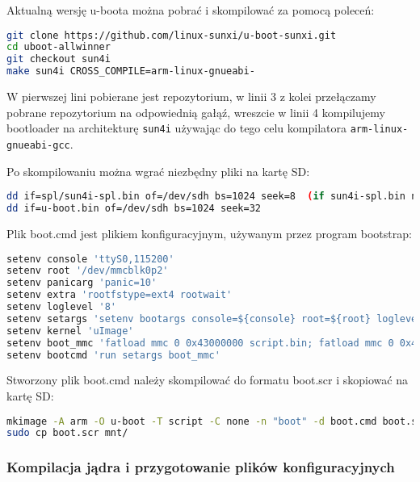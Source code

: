 \par

Aktualną wersję u-boota można pobrać i skompilować za pomocą poleceń:

\begin{lstlisting}[language=bash]
git clone https://github.com/linux-sunxi/u-boot-sunxi.git
cd uboot-allwinner
git checkout sun4i
make sun4i CROSS_COMPILE=arm-linux-gnueabi-
\end{lstlisting}

\par

W pierwszej lini pobierane jest repozytorium, w linii 3 z kolei przełączamy pobrane repozytorium na odpowiednią gałąź, wreszcie w linii 4 kompilujemy bootloader na architekturę \lstinline|sun4i| używając do tego celu kompilatora \lstinline|arm-linux-gnueabi-gcc|.

Po skompilowaniu można wgrać niezbędny pliki na kartę SD:

\begin{lstlisting}[language=bash]
dd if=spl/sun4i-spl.bin of=/dev/sdh bs=1024 seek=8  (if sun4i-spl.bin not found, try sunxi-spl.bin)
dd if=u-boot.bin of=/dev/sdh bs=1024 seek=32
\end{lstlisting}

\par

Plik boot.cmd jest plikiem konfiguracyjnym, używanym przez program bootstrap:

\begin{lstlisting}[language=bash]
setenv console 'ttyS0,115200'
setenv root '/dev/mmcblk0p2'
setenv panicarg 'panic=10'
setenv extra 'rootfstype=ext4 rootwait'
setenv loglevel '8'
setenv setargs 'setenv bootargs console=${console} root=${root} loglevel=${loglevel} ${panicarg} ${extra}'
setenv kernel 'uImage'
setenv boot_mmc 'fatload mmc 0 0x43000000 script.bin; fatload mmc 0 0x48000000 ${kernel}; bootm 0x48000000'
setenv bootcmd 'run setargs boot_mmc'
\end{lstlisting}

Stworzony plik boot.cmd należy skompilować do formatu boot.scr i skopiować na kartę SD:

\begin{lstlisting}[language=bash]
mkimage -A arm -O u-boot -T script -C none -n "boot" -d boot.cmd boot.scr
sudo cp boot.scr mnt/
\end{lstlisting}


\subsubsection{Kompilacja jądra i przygotowanie plików konfiguracyjnych}


